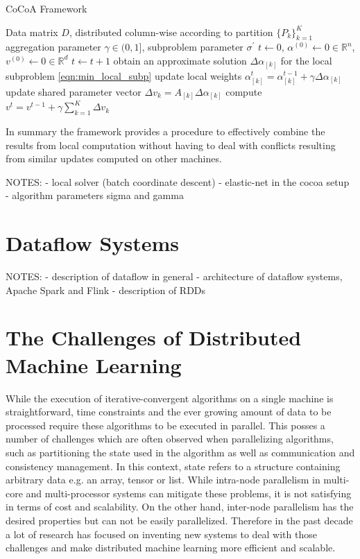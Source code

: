 \begin{algorithm}
\caption{CoCoA Framework}\label{alg:cocoa}
\begin{algorithmic}[1]{}
\DATA Data matrix $D$, distributed column-wise according to partition $\{P_k\}_{k=1}^K$
\INPUT aggregation parameter $\gamma \in (0,1]$, subproblem parameter $\sigma^\prime$
\INIT $t \gets 0$, $\alpha^{(0)} \gets 0 \in \mathbb{R}^n$, $v^{(0)} \gets 0 \in \mathbb{R}^d$ 
\Repeat
\State $t \gets t + 1$
\State obtain an approximate solution $\Delta\alpha_{[k]}$ for the local subproblem \ref{eqn:min_local_subp}
\State update local weights $\alpha_{[k]}^{t} = \alpha_{[k]}^{t-1} + \gamma\Delta\alpha_{[k]}$
\State update shared parameter vector $\Delta v_k = A_{[k]}\Delta\alpha_{[k]}$
\EndFor
\State compute $v^{t} = v^{t-1} + \gamma\sum_{k=1}^K\Delta v_k$
\end{algorithmic}
\end{algorithm}
In summary the framework provides a procedure to effectively combine the results from local computation without having to deal with conflicts resulting from similar updates computed on other machines.

NOTES:
- local solver (batch coordinate descent)
- elastic-net in the cocoa setup
- algorithm parameters sigma and gamma


\section{Dataflow Systems}
\label{s:dataflow}
NOTES:
- description of dataflow in general
- architecture of dataflow systems, Apache Spark and Flink
- description of RDDs

\section{The Challenges of Distributed Machine Learning}
\label{s:distributed_ml}
While the execution of iterative-convergent algorithms on a single machine is straightforward, time constraints and the ever growing amount of data to be processed require these algorithms to be executed in parallel.
This posses a number of challenges which are often observed when parallelizing algorithms, such as partitioning the state used in the algorithm as well as communication and consistency management.
In this context, state refers to a structure containing arbitrary data e.g. an array, tensor or list.
While intra-node parallelism in multi-core and multi-processor systems can mitigate these problems, it is not satisfying in terms of cost and scalability.
On the other hand, inter-node parallelism has the desired properties but can not be easily parallelized.
Therefore in the past decade a lot of research has focused on inventing new systems to deal with those challenges and make distributed machine learning more efficient and scalable.

